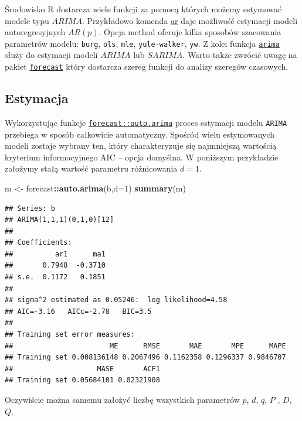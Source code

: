 \documentclass[polish,]{book}
\newenvironment{Shaded}{\begin{snugshade}}{\end{snugshade}}
\newcommand{\DataTypeTok}[1]{\textcolor[rgb]{0.13,0.29,0.53}{#1}}
\newcommand{\DecValTok}[1]{\textcolor[rgb]{0.00,0.00,0.81}{#1}}
\newcommand{\KeywordTok}[1]{\textcolor[rgb]{0.13,0.29,0.53}{\textbf{#1}}}
\newcommand{\NormalTok}[1]{#1}
\newcommand{\OperatorTok}[1]{\textcolor[rgb]{0.81,0.36,0.00}{\textbf{#1}}}
\newcommand{\StringTok}[1]{\textcolor[rgb]{0.31,0.60,0.02}{#1}}
\begin{document}
Środowisko R dostarcza wiele funkcji za pomocą których możemy estymować
modele typu \(ARIMA\). Przykładowo komenda \href{https://rdrr.io/r/stats/ar.html}{ar} daje możliwość estymacji modeli autoregresyjnych \(AR(p)\). Opcja method oferuje kilka sposobów szacowania
parametrów modelu: \texttt{burg}, \texttt{ols}, \texttt{mle}, \texttt{yule-walker}, \texttt{yw}. Z kolei funkcja \href{https://rdrr.io/r/stats/arima.html}{\texttt{arima}} służy do estymacji modeli \(ARIMA\) lub \(SARIMA\). Warto także
zwrócić uwagę na pakiet \href{https://rdrr.io/cran/forecast/}{\texttt{forecast}} który dostarcza szereg funkcji do analizy szeregów czasowych.

\hypertarget{part_731}{%
\subsection{Estymacja}\label{part_731}}

Wykorzystując funkcje \href{https://rdrr.io/cran/forecast/man/auto.arima.html}{\texttt{forecast::auto.arima}} proces estymacji modelu \texttt{ARIMA}
przebiega w sposób całkowicie automatyczny. Spośród wielu estymowanych modeli zostaje wybrany ten, który charakteryzuje się najmniejszą wartością kryterium
informacyjnego AIC -- opcja domyślna. W poniższym przykładzie założymy stałą wartość parametru różnicowania \(d=1\).

\begin{Shaded}
\begin{Highlighting}[]
\NormalTok{m <-}\StringTok{ }\NormalTok{forecast}\OperatorTok{::}\KeywordTok{auto.arima}\NormalTok{(b,}\DataTypeTok{d=}\DecValTok{1}\NormalTok{)}
\KeywordTok{summary}\NormalTok{(m)}
\end{Highlighting}
\end{Shaded}

\begin{verbatim}
## Series: b 
## ARIMA(1,1,1)(0,1,0)[12] 
## 
## Coefficients:
##          ar1      ma1
##       0.7948  -0.3710
## s.e.  0.1172   0.1851
## 
## sigma^2 estimated as 0.05246:  log likelihood=4.58
## AIC=-3.16   AICc=-2.78   BIC=3.5
## 
## Training set error measures:
##                       ME      RMSE       MAE       MPE      MAPE
## Training set 0.008136148 0.2067496 0.1162358 0.1296337 0.9846707
##                    MASE       ACF1
## Training set 0.05684101 0.02321908
\end{verbatim}

Oczywiście można samemu założyć liczbę wszystkich parametrów \(p\), \(d\), \(q\), \(P\) , \(D\), \(Q\).
\end{document}
